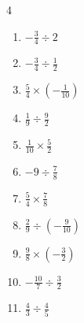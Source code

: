 \begin{multicols}{4}
\begin{enumerate}

  \item $\displaystyle -\frac{3}{4}\div{}2$


  \item $\displaystyle -\frac{3}{4}\div{}\frac{1}{2}$


  \item $\displaystyle \frac{5}{4}\times{}\left(-\frac{1}{10}\right)$


  \item $\displaystyle \frac{1}{9}\div{}\frac{9}{2}$


  \item $\displaystyle \frac{1}{10}\times{}\frac{5}{2}$


  \item $\displaystyle -9\div{}\frac{7}{8}$


  \item $\displaystyle \frac{5}{4}\times{}\frac{7}{8}$


  \item $\displaystyle \frac{2}{9}\div{}\left(-\frac{9}{10}\right)$


\columnbreak %

  \item $\displaystyle \frac{9}{8}\times{}\left(-\frac{3}{2}\right)$


  \item $\displaystyle -\frac{10}{7}\div{}\frac{3}{2}$


  \item $\displaystyle \frac{4}{3}\div{}\frac{4}{5}$



\end{enumerate}
\end{multicols}
